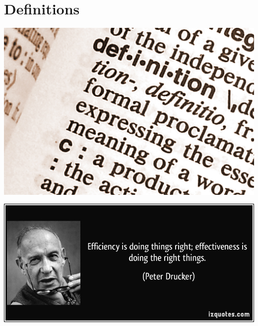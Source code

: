 \documentclass[14pt,notes]{beamer}
\begin{document}
\section{Definitions}
\begin{frame}
\includegraphics[width=\textwidth]{definition}
\end{frame}

\begin{frame}
\includegraphics[width=\textwidth]{quote-efficiency-is-doing-things-right-effectiveness-is-doing-the-right-things-peter-drucker-53210}
\end{frame}
\end{document}
